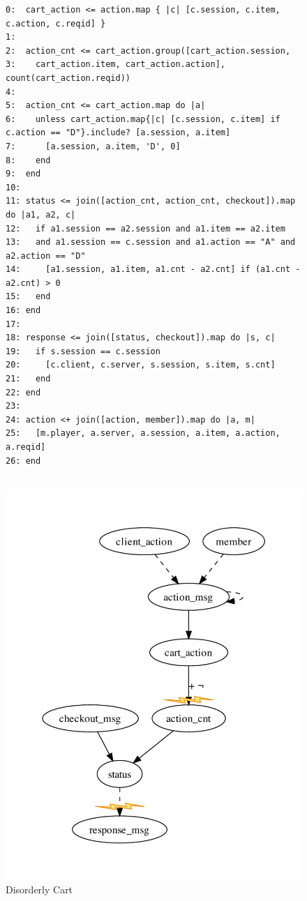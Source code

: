 \begin{figure}[t]
\begin{tiny}
\begin{verbatim}
0:  cart_action <= action.map { |c| [c.session, c.item, c.action, c.reqid] }
1:
2:  action_cnt <= cart_action.group([cart_action.session, 
3:    cart_action.item, cart_action.action], count(cart_action.reqid))
4:
5:  action_cnt <= cart_action.map do |a| 
6:    unless cart_action.map{|c| [c.session, c.item] if c.action == "D"}.include? [a.session, a.item] 
7:      [a.session, a.item, 'D', 0]
8:    end 
9:  end
10: 
11: status <= join([action_cnt, action_cnt, checkout]).map do |a1, a2, c| 
12:   if a1.session == a2.session and a1.item == a2.item 
13:   and a1.session == c.session and a1.action == "A" and a2.action == "D"
14:     [a1.session, a1.item, a1.cnt - a2.cnt] if (a1.cnt - a2.cnt) > 0
15:   end
16: end
17:
18: response <= join([status, checkout]).map do |s, c| 
19:   if s.session == c.session
20:     [c.client, c.server, s.session, s.item, s.cnt]
21:   end
22: end
23: 
24: action <+ join([action, member]).map do |a, m|
25:   [m.player, a.server, a.session, a.item, a.action, a.reqid]
26: end


\end{verbatim}
\end{tiny}

\centering
\includegraphics[width=0.7\linewidth]{fig/disorderly.pdf}
\caption{Disorderly Cart}
\label{fig:pdg-disorderly}
\end{figure}


